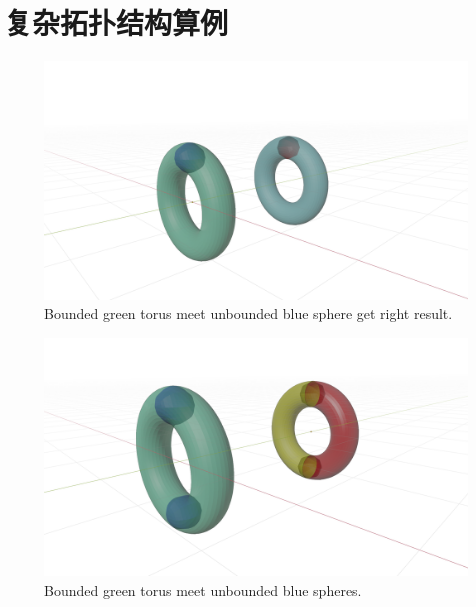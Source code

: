 \documentclass[a4paper]{book}
\numberwithin{equation}{chapter}
\theoremstyle{definition}
\begin{document}
\section{复杂拓扑结构算例}
\begin{figure}
    \caption{Bounded green torus meet unbounded blue sphere get right result.}
    \includegraphics[width = 18cm]{fig/s3s3.png}
\end{figure}

\begin{figure}
    \caption{Bounded green torus meet unbounded blue spheres.}
    \includegraphics[width = 18cm]{fig/s3s4.png}
\end{figure}
\end{document}
